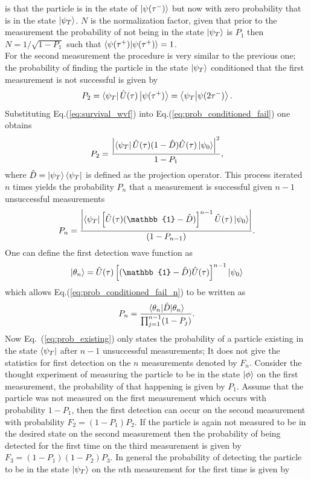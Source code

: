 \documentclass[12pt]{article}
\numberwithin{equation}{section}
\newcommand{\1}{\mathbb{1}}
\newcommand{\state}{\ket{\psi_T}}
\newcommand{\projection}{\bra{\psi_T}}
\begin{document}
is that the particle is in the state of $\ket{\psi(\tau^-)}$ but now with zero probability that is in the state $\state$. $N$ is the normalization factor, given that prior to the measurement the probability of not being in the state $\state$ is $P_1$ then $N=1/\sqrt{1-P_1}$ such that $\braket{\psi(\tau^+)}{\psi(\tau^+)}=1$.
\\
For the second measurement the procedure is very similar to the previous one; the probability of finding the particle in the state $\state$ conditioned that the first measurement is not successful is given by
\begin{equation}\label{eq:prob_conditioned_fail}
    P_2=\projection \hat{U}(\tau)\ket{\psi(\tau^+)}=\projection\ket{\psi(2\tau^-)}.
\end{equation}
Substituting Eq.(\ref{eq:survival_wvf}) into Eq.(\ref{eq:prob_conditioned_fail}) one obtains
\begin{equation}
    P_2=\frac{\abs{\projection\hat{U}(\tau)(1-\hat{D})\hat{U}(\tau)\ket{\psi_0}}^2}{1-P_1},
\end{equation}
where $\hat{D}=\state\projection$ is defined as the projection operator.
This process iterated $n$ times yields the probability $P_n$ that a measurement is successful given $n-1$ unsuccessful measurements
\begin{equation}\label{eq:prob_conditioned_fail_n}
    P_n=\frac
    {\abs
    {\projection \left[\hat{U}(\tau)(\1-\hat{D})\right]^{n-1}\hat{U}(\tau)\ket{\psi_0}}}
    {(1-P_{n-1})}.
\end{equation}
One can define the first detection wave function as
\begin{equation}\label{eq:first_det_wvf}
    \ket{\theta_n}=\hat{U}(\tau)\left[(\1-\hat{D})\hat{U}(\tau)\right]^{n-1}\ket{\psi_0}
\end{equation}
which allows Eq.(\ref{eq:prob_conditioned_fail_n}) to be written as
\begin{equation}\label{eq:prob_existing}
    P_n=\frac
    {\ev{\hat{D}}{\theta_n}}
    {\prod_{j=1}^{n-1}(1-P_j)}.
\end{equation}
Now Eq.~(\ref{eq:prob_existing}) only states the probability of a particle existing in the state $\projection$ after $n-1$ unsuccessful measurements; It does not give the statistics for first detection on the $n$ measurements denoted by $F_n$. Consider the thought experiment of measuring the particle to be in the state $\ket{\phi}$ on the first measurement, the probability of that happening is given by $P_1$. Assume that the particle was not measured on the first measurement which occurs with probability $1-P_1$, then the first detection can occur on the second measurement with probability $F_2=(1-P_1)P_2$. If the particle is again not measured to be in the desired state on the second measurement then the probability of being detected for the first time on the third measurement is given by $F_3=(1-P_1)(1-P_2)P_3$. In general the probability of detecting the particle to be in the state $\state$ on the $n$th measurement for the first time is given by 
\end{document}
